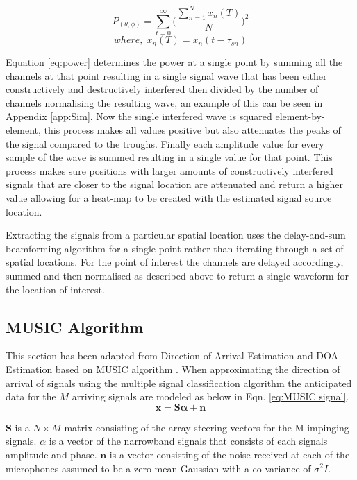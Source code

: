 \documentclass{UoNMCHA}
\numberwithin{equation}{section}
\begin{document}
    \begin{equation}
        P_{(\theta, \phi)} = \sum_{t=0}^\infty\Big(\frac{\sum_{n=1}^N x_n(T)}{N}\Big)^2
        \label{eq:power}
    \end{equation}
    \begin{equation*}
        where,\;x_n(T) = x_n(t-\tau_{sn})
    \end{equation*}
    
    Equation \ref{eq:power} determines the power at a single point by summing all the channels at that point resulting in a single signal wave that has been either constructively and destructively interfered then divided by the number of channels normalising the resulting wave, an example of this can be seen in Appendix \ref{app:Sim}. Now the single interfered wave is squared element-by-element, this process makes all values positive but also attenuates the peaks of the signal compared to the troughs. Finally each amplitude value for every sample of the wave is summed resulting in a single value for that point. This process makes sure positions with larger amounts of constructively interfered signals that are closer to the signal location are attenuated and return a higher value allowing for a heat-map to be created with the estimated signal source location.
    
    Extracting the signals from a particular spatial location uses the delay-and-sum beamforming algorithm for a single point rather than iterating through a set of spatial locations. For the point of interest the channels are delayed accordingly, summed and then normalised as described above to return a single waveform for the location of interest.
    
\subsection{MUSIC Algorithm} \label{sec:Software MUSIC}
    This section has been adapted from Direction of Arrival Estimation \citep{Adv13} and DOA Estimation based on MUSIC algorithm \citep{Tan14}. When approximating the direction of arrival of signals using the multiple signal classification algorithm the anticipated data for the $M$ arriving signals are modeled as below in Eqn. \ref{eq:MUSIC signal}. 
    \begin{equation}
        \mathbf{x}=\mathbf{S\alpha} + \mathbf{n}
        \label{eq:MUSIC signal}
    \end{equation}

    $\mathbf{S}$ is a $N \times M$ matrix consisting of the array steering vectors for the M impinging signals. $\alpha$ is a vector of the narrowband signals that consists of each signals amplitude and phase. $\mathbf{n}$ is a vector consisting of the noise received at each of the microphones assumed to be a zero-mean Gaussian with a co-variance of $\sigma^2I$.
\end{document}
